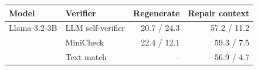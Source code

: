 \begin{tabular}{llrr}
\toprule
Model & Verifier & Regenerate & Repair context \\
\midrule
Llama-3.2-3B & LLM self-verifier & 20.7 / 24.3 & 57.2 / 11.2 \\
 & MiniCheck & 22.4 / 12.1 & 59.3 / 7.5 \\
 & Text match & -- & 56.9 / 4.7 \\
\bottomrule
\end{tabular}
